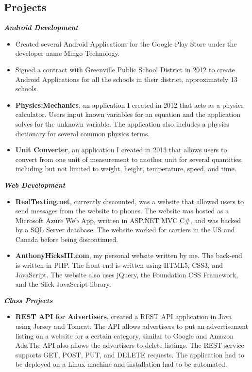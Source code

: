 \documentclass[10pt]{res}
\begin{document}
\begin{resume}
\section{Projects}
\textbf{\textit{Android Development}}
	\vspace*{.25em}
	\begin{itemize}
		\item Created several Android Applications for the Google Play Store under the developer name Mingo Technology.
		\item Signed a contract with Greenville Public School District in 2012 to create Android Applications for all the schools in their district, approximately 13 schools. 
		\item \textbf{Physics:Mechanics}, an application I created in 2012 that acts as a physics calculator. Users input known variables for an equation and the application solves for the unknown variable. The application also includes a physics dictionary for several common physics terms. 
		\item \textbf{Unit Converter}, an application I created in 2013 that allows users to convert from one unit of measurement to another unit for several quantities, including but not limited to weight, height, temperature, speed, and time. 
	\end{itemize} 
\textbf{\textit{Web Development}}
	\vspace*{.25em}
	\begin{itemize}
		\item \textbf{RealTexting.net}, currently discounted, was a website that allowed users to send messages from the website to phones. The website was hosted as a Microsoft Azure Web App, written in ASP.NET MVC C\#, and was backed by a SQL Server database. The website worked for carriers in the US and Canada before being discontinued. 
		\item \textbf{AnthonyHicksIII.com}, my personal website written by me. The back-end is written in PHP. The front-end is written using HTML5, CSS3, and JavaScript. The website also uses jQuery, the Foundation CSS Framework, and the Slick JavaScript library.
	\end{itemize}
\textbf{\textit{Class Projects}}
	\vspace*{.25em}
	\begin{itemize}
		\item \textbf{REST API for Advertisers}, created a REST API application in Java using Jersey and Tomcat. The API allows advertisers to put an advertisement listing on a website for a certain category, similar to Google and Amazon Ads.The API also allows the advertisers to delete listings. The REST service supports GET, POST, PUT, and DELETE requests. The application had to be deployed on a Linux machine and installation had to be automated. 
	\end{itemize} 


\end{resume}
\end{document}
